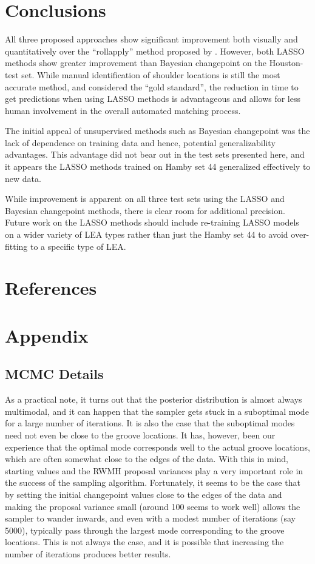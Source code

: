 \documentclass[12pt]{article}
\begin{document}
\section{Conclusions}

All three proposed approaches show significant improvement both visually
and quantitatively over the ``rollapply'' method proposed by
\cite{Hare1}. However, both LASSO methods show greater improvement than
Bayesian changepoint on the Houston-test set. While manual
identification of shoulder locations is still the most accurate method,
and considered the ``gold standard'', the reduction in time to get
predictions when using LASSO methods is advantageous and allows for less
human involvement in the overall automated matching process.

The initial appeal of unsupervised methods such as Bayesian changepoint
was the lack of dependence on training data and hence, potential
generalizability advantages. This advantage did not bear out in the test
sets presented here, and it appears the LASSO methods trained on Hamby
set 44 generalized effectively to new data.

While improvement is apparent on all three test sets using the LASSO and
Bayesian changepoint methods, there is clear room for additional
precision. Future work on the LASSO methods should include re-training
LASSO models on a wider variety of LEA types rather than just the Hamby
set 44 to avoid over-fitting to a specific type of LEA.

\section{References}

\section{Appendix}

\subsection{MCMC Details}

As a practical note, it turns out that the posterior distribution is
almost always multimodal, and it can happen that the sampler gets stuck
in a suboptimal mode for a large number of iterations. It is also the
case that the suboptimal modes need not even be close to the groove
locations. It has, however, been our experience that the optimal mode
corresponds well to the actual groove locations, which are often
somewhat close to the edges of the data. With this in mind, starting
values and the RWMH proposal variances play a very important role in the
success of the sampling algorithm. Fortunately, it seems to be the case
that by setting the initial changepoint values close to the edges of the
data and making the proposal variance small (around 100 seems to work
well) allows the sampler to wander inwards, and even with a modest
number of iterations (say 5000), typically pass through the largest mode
corresponding to the groove locations. This is not always the case, and
it is possible that increasing the number of iterations produces better
results.
\end{document}
